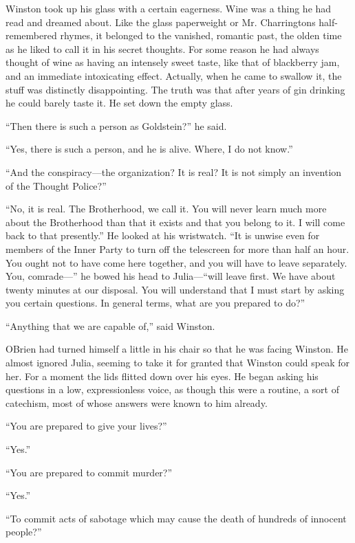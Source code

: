 Winston took up his glass with a certain eagerness. Wine was a thing he
had read and dreamed about. Like the glass paperweight or Mr.
Charrington\textquotesingle s half-remembered rhymes, it belonged to the
vanished, romantic past, the olden time as he liked to call it in his
secret thoughts. For some reason he had always thought of wine as having
an intensely sweet taste, like that of blackberry jam, and an immediate
intoxicating effect. Actually, when he came to swallow it, the stuff was
distinctly disappointing. The truth was that after years of gin drinking
he could barely taste it. He set down the empty glass.

``Then there is such a person as Goldstein?'' he said.

``Yes, there is such a person, and he is alive. Where, I do not know.''

``And the conspiracy---the organization? It is real? It is not simply an
invention of the Thought Police?''

``No, it is real. The Brotherhood, we call it. You will never learn much
more about the Brotherhood than that it exists and that you belong to
it. I will come back to that presently.'' He looked at his wristwatch.
``It is unwise even for members of the Inner Party to turn off the
telescreen for more than half an hour. You ought not to have come here
together, and you will have to leave separately. You, comrade---'' he
bowed his head to Julia---``will leave first. We have about twenty
minutes at our disposal. You will understand that I must start by asking
you certain questions. In general terms, what are you prepared to do?''

``Anything that we are capable of,'' said Winston.

O\textquotesingle Brien had turned himself a little in his chair so that
he was facing Winston. He almost ignored Julia, seeming to take it for
granted that Winston could speak for her. For a moment the lids flitted
down over his eyes. He began asking his questions in a low,
expressionless voice, as though this were a routine, a sort of
catechism, most of whose answers were known to him already.

``You are prepared to give your lives?''

``Yes.''

``You are prepared to commit murder?''

``Yes.''

``To commit acts of sabotage which may cause the death of hundreds of
innocent people?''

